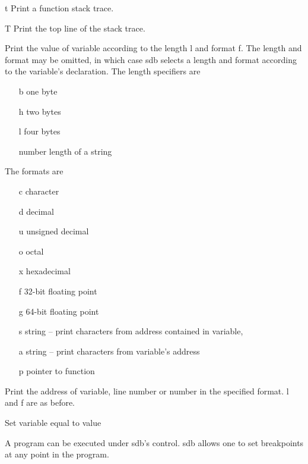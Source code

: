 \begin{hanglist}
\item[\cd t] Print a function stack trace.

\item[\cd T] Print the top line of the stack trace.

 Print the  value of {\ms variable\/} according to the length {\cd l}
and  format {\cd f}.  The length  and format may be omitted, in which
case {\cmd sdb} selects a length and format according to the variable's
declaration.  The length specifiers are
\begin{itemize}
\item[{\cd b}] one byte
\item[{\cd h}] two bytes
\item[{\cd l}] four bytes
\item[{\ms number}]  length of a string
\end{itemize}
The  formats are
\begin{itemize}
\item[{\cd c}] character
\item[{\cd d}]  decimal
\item[{\cd u}] unsigned decimal
\item[{\cd o}] octal
\item[{\cd x}] hexadecimal
\item[{\cd f}] 32-bit floating point
\item[{\cd g}] 64-bit  floating point
\item[{\cd s}] string -- print characters  from address  contained in variable,
\item[{\cd a}] string -- print characters  from variable's  address
\item[{\cd p}] pointer to function
\end{itemize}

 Print the  address of  {\ms variable\/}, {\ms line
 number\/} or {\ms number\/} in the specified format.  {\cd l} and
 {\cd f} are as before.

 Set {\ms variable\/} equal to {\ms value\/}

\end{hanglist}
A  program can be executed under  {\cmd sdb}'s control.  {\cmd
sdb} allows one to set breakpoints at  any point  in  the  program. 
